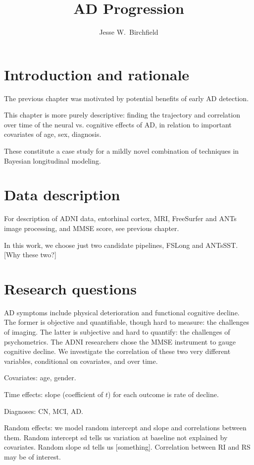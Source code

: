 \documentclass[12pt]{article}
\title{AD Progression}
\author{Jesse W.~Birchfield}
\begin{document}
\maketitle

\pagebreak
\section{Introduction and rationale}

The previous chapter was motivated by potential benefits of early AD detection.
 
This chapter is more purely descriptive: finding the trajectory and correlation over time of the neural vs. cognitive effects of AD, in relation to important covariates of age, sex, diagnosis. 

These constitute a case study for a mildly novel combination of techniques in Bayesian longitudinal modeling. 

\section{Data description}

For description of ADNI data, entorhinal cortex, MRI, FreeSurfer and ANTs image processing, and MMSE score, see previous chapter. 

In this work, we choose just two candidate pipelines, FSLong and ANTsSST. [Why these two?]

\section{Research questions}

AD symptoms include physical deterioration and functional cognitive decline. The former is objective and quantifiable, though hard to measure: the challenges of imaging. The latter is subjective and hard to quantify: the challenges of psychometrics. The ADNI researchers chose the MMSE instrument to gauge cognitive decline. We investigate the correlation of these two very different variables, conditional on covariates, and over time. 

Covariates: age, gender. 

Time effects: slope (coefficient of $t$) for each outcome is rate of decline.  

Diagnoses: CN, MCI, AD.

Random effects: we model random intercept and slope and correlations between them. Random intercept sd tells us variation at baseline not explained by covariates. Random slope sd tells us [something]. Correlation between RI and RS may be of interest. 
\end{document}
